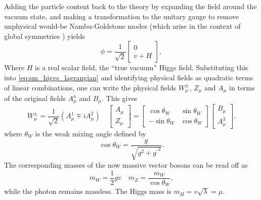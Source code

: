 Adding the particle content back to the theory by expanding the field around the vacuum state, and making a transformation to the unitary gauge to remove unphysical would\nobreakdash-be Nambu-Goldstone modes (which arise in the context of global symmetries \cite{PhysRev.117.648,Goldstone1961FieldTW}) yields
%
\begin{equation}
  \phi = 
  \frac{1}{\sqrt{2}}
  \begin{bmatrix}
    0 \\ v + H
  \end{bmatrix} ,
\end{equation}
%
Where $H$ is a real scalar field, the ``true vacuum'' Higgs field.
Substituting this into \cref{eq:sm_higgs_lagrangian} and identifying physical fields as quadratic terms of linear combinations, one can write the physical fields $W_\mu^\pm$, $Z_\mu$ and $A_\mu$ in terms of the original fields $A^a_\mu$ and $B_\mu$.
This gives
%
\begin{equation}\label{eq:ew_physical_unphysical_fields}
  W_\mu^\pm = 
  \frac{1}{\sqrt{2}} (A^1_\mu \mp i A^2_\mu)
  \quad
  \begin{bmatrix}
    A_\mu \\ Z_\mu
  \end{bmatrix} =
  \begin{bmatrix}
      \cos\theta_W &  \sin\theta_W \\ 
    - \sin\theta_W &  \cos\theta_W
  \end{bmatrix}
  \begin{bmatrix}
    B_\mu \\ A^3_\mu 
  \end{bmatrix} .
\end{equation}
%
where $\theta_W$ is the weak mixing angle defined by 
%
\begin{equation}\label{eq:ew_coupling_weak_mixing_angle}
  \cos\theta_W = \frac{g}{\sqrt{g^2 + {g^\prime}^2}} .
\end{equation}
%
The corresponding masses of the now massive vector bosons can be read off as 
%
\begin{equation}
  m_W = \frac{1}{2} g v
  \quad
  m_Z = \frac{m_W}{\cos\theta_W} , %
\end{equation}
%
while the photon remains massless.
The Higgs mass is $m_H = v \sqrt{\lambda} = \mu$.

